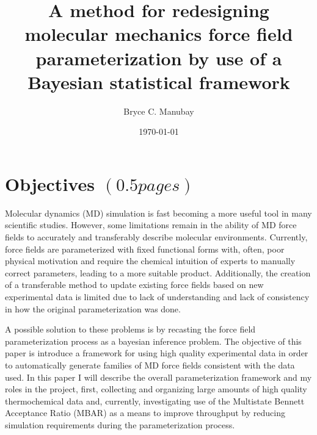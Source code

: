 \documentclass[rmp,nofootinbib,superscriptaddress,12pt,tightenlines,notitlepage]{revtex4-1}
\begin{document}


\title{A method for redesigning molecular mechanics force field parameterization by use of a Bayesian statistical framework}
\author{Bryce C. Manubay} 
\date{\today}

\maketitle
\section{Objectives $\left(0.5 pages\right)$}
Molecular dynamics (MD) simulation is fast becoming a more useful tool in many scientific studies. However, some limitations remain in the ability of MD force fields to accurately and transferably describe molecular environments. Currently, force fields are parameterized with fixed functional forms with, often, poor physical motivation and require the chemical intuition of experts to manually correct parameters, leading to a more suitable product. Additionally, the creation of a transferable method to update existing force fields based on new experimental data is limited due to lack of understanding and lack of consistency in how the original parameterization was done.


A possible solution to these problems is by recasting the force field parameterization process as a bayesian inference problem. The objective of this paper is introduce a framework for using high quality experimental data in order to automatically generate families of MD force fields consistent with the data used. In this paper I will describe the overall parameterization framework and my roles in the project, first, collecting and organizing large amounts of high quality thermochemical data and, currently, investigating use of the Multistate Bennett Acceptance Ratio (MBAR) as a means to improve throughput by reducing simulation requirements during the parameterization process.
\end{document}
